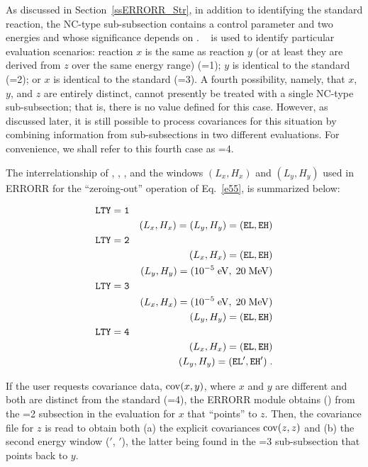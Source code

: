 As discussed in Section~\ref{ssERRORR_Str}, in addition to identifying
the standard reaction, the NC-type sub-subsection contains a control parameter
 and two energies  and  whose
significance depends on .   ~ is used to identify
particular evaluation scenarios: reaction $x$ is the same as reaction
$y$ (or at least they are derived from $z$ over the same energy range)
(=1); $y$ is identical to the standard (=2); or
$x$ is identical to the standard (=3).  A fourth
possibility, namely, that $x$, $y$, and $z$ are entirely distinct,
cannot presently be treated with a single NC-type sub-subsection; that
is, there is no  value defined for this case.  However, as
discussed later, it is still possible to process covariances for this
situation by combining information from sub-subsections in two
different evaluations.  For convenience, we shall refer to this fourth
case as =4.

The interrelationship of , , , and the
windows $(L_x,H_x)$ and $(L_y,H_y)$ used in ERRORR for the
``zeroing-out'' operation of Eq.~\ref{e55}, is summarized below:

\small
\begin{eqnarray}
\mathtt{LTY=1}  \nonumber \\
   &   & (L_x, H_x) = (L_y, H_y) = (\mathtt{EL},\mathtt{EH}) \nonumber \\
\mathtt{LTY=2} \nonumber \\
   &   & (L_x, H_x) =  (\mathtt{EL},\mathtt{EH}) \nonumber \\
   &   & (L_y, H_y) = (10^{-5} \;{\rm eV},\; 20 \;{\rm MeV}) \nonumber \\
\mathtt{LTY=3} \nonumber \\
   &   & (L_x, H_x) = (10^{-5}\; {\rm eV},\; 20 \; {\rm MeV}) \nonumber \\
   &   & (L_y, H_y) =  (\mathtt{EL},\mathtt{EH}) \nonumber \\
\mathtt{LTY=4} \nonumber \\
   &   & (L_x, H_x) =  (\mathtt{EL},\mathtt{EH}) \nonumber \\
   &   & (L_y, H_y) =  (\mathtt{EL'},\mathtt{EH'}) \; .
\end{eqnarray}
\normalsize

\noindent
If the user requests covariance data, ${\rm {\rm cov}}(x,y)$, where $x$
and $y$ are different and both are distinct from the standard
(=4), the ERRORR module obtains () from the
=2 subsection in the evaluation for $x$ that ``points'' to
$z$.  Then, the covariance file for $z$ is read to obtain both (a) the
explicit covariances ${\rm {\rm cov}}(z,z)$ and (b) the second energy
window ($'$, $'$), the latter being found in the
=3 sub-subsection that points back to $y$.

